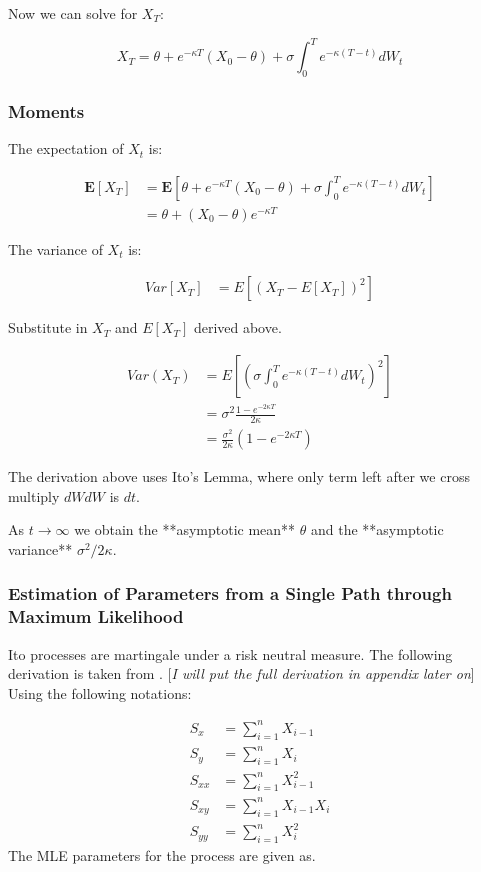 Now we can solve for $X_T$:

$$ 
X_T = \theta + e^{-\kappa T} (X_0 - \theta) + \sigma \int^T_0 e^{-\kappa (T-t)} dW_t
$$

\subsubsection{Moments}

The expectation of $X_t$ is:

$$
\begin{aligned}
	\mathbf{E}\left[X_T\right] &= \mathbf{E}\left[\theta + e^{-\kappa T} (X_0 - \theta) + \sigma \int^T_0 e^{-\kappa (T-t)} dW_t\right] \\	
    &= \theta + \left(X_0 - \theta\right) e^{-\kappa T} 
\end{aligned}
$$

The variance of $X_t$ is:

$$
	\begin{aligned}
		Var[X_T] &= E[(X_T- E[X_T])^2] 
	\end{aligned}
$$

Substitute in $X_T$ and $E[X_T]$ derived above.

$$
	\begin{aligned}
		Var(X_T) &= E[(\sigma \int^T_0 e^{-\kappa (T-t)} dW_t)^2] \\
        &= \sigma^2 \frac{1-e^{-2\kappa T}}{2 \kappa} \\
        &= \frac{\sigma^2}{2 \kappa}(1-e^{-2\kappa T})
	\end{aligned}
$$

The derivation above uses Ito's Lemma,  where only term left after we cross multiply $dWdW$ is $dt$.

As $t\to \infty$ we obtain the **asymptotic mean** $\theta$ and the **asymptotic variance** $\sigma^2/2\kappa$.

\subsubsection{ Estimation of Parameters  from a Single Path through Maximum Likelihood }

Ito processes are martingale under a risk neutral measure. The following derivation is taken from \cite{calibratingOuProcess}. [\textit{I will put the full derivation in appendix later on}] \\

Using the following notations:

$$
	\begin{aligned}
		S_x &= \sum_{i=1}^n X_{i-1} \\
		S_y &= \sum_{i=1}^n X_{i} \\
		S_{xx} &= \sum_{i=1}^n X_{i-1}^2 \\
		S_{xy} &= \sum_{i=1}^n X_{i-1}X_{i} \\
		S_{yy} &= \sum_{i=1}^n X_{i}^2
	\end{aligned}
$$
The MLE parameters for the process are given as.  \\

